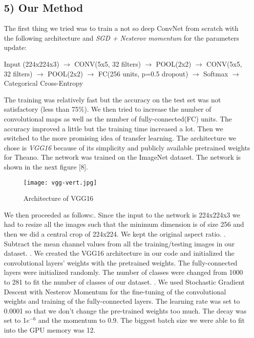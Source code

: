 \documentclass[a4paper]{article}
\begin{document}
\subsection*{5) Our Method}
\begin{justify}
The first thing we tried was to train a not so deep ConvNet from scratch with the following architecture and \textit{SGD + Nesterov momentum} for the parameters update:
\newline
\begin{tcolorbox}
Input (224x224x3) $\rightarrow$ CONV(5x5, 32 filters) $\rightarrow$ POOL(2x2) $\rightarrow$ CONV(5x5, 32 filters) $\rightarrow$ POOL(2x2) $\rightarrow$ FC(256 units, p=0.5 dropout) $\rightarrow$ Softmax $\rightarrow$ Categorical Cross-Entropy
\end{tcolorbox}

The training was relatively fast but the accuracy on the test set was not satisfactory (less than 75\%). We then tried to increase the number of convolutional maps as well as the number of fully-connected(FC) units. The accuracy improved a little but the training time increased a lot. Then we switched to the more promising idea of transfer learning. The architecture we chose is \textit{VGG16} because of its simplicity and publicly available pretrained weights for Theano. The network was trained on the ImageNet dataset. The network is shown in the next figure [8].

   		\begin{figure}[H]
   			\vspace*{-6em}
   			\begin{center}
   				\texttt{[image: vgg-vert.jpg]}
   				\caption{Architecture of VGG16}
   			\end{center}
   		\end{figure}
 	
We then proceeded as follows:. Since the input to the network is 224x224x3 we had to resize all the images such that the minimum dimension is of size 256 and then we did a central crop of 224x224. We kept the original aspect ratio.
. Subtract the mean channel values from all the training/testing images in our dataset.
. We created the VGG16 architecture in our code and initialized the convolutional layers' weights with the pretrained weights. The fully-connected layers were initialized randomly. The number of classes were changed from 1000 to 281 to fit the number of classes of our dataset.
. We used Stochastic Gradient Descent with Nesterov Momentum for the fine-tuning of the convolutional weights and training of the fully-connected layers. The learning rate was set to 0.0001 so that we don't change the pre-trained weights too much. The decay was set to 1$e^{-6}$ and the momentum to 0.9. The biggest batch size we were able to fit into the GPU memory was 12. 
\end{justify}
\end{document}
